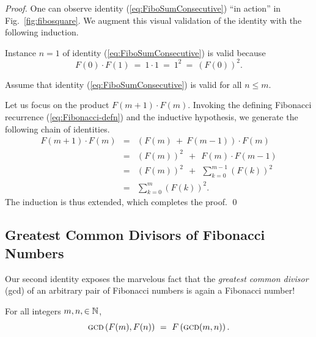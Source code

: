 \begin{proof}
One can observe identity (\ref{eq:FiboSumConsecutive}) ``in action'' in Fig.~\ref{fig:fibosquare}.  We augment this visual validation of the identity with the following induction.

\medskip

Instance $n=1$ of identity (\ref{eq:FiboSumConsecutive}) is valid because
\[ F(0) \cdot F(1) \ = \ 1 \cdot 1 \ = \ 1^2 \ = \ (F(0))^2. \]

\medskip

Assume that identity (\ref{eq:FiboSumConsecutive}) is valid for all $n \leq m$.

\medskip

Let us focus on the product $F(m+1) \cdot F(m)$.  Invoking the defining Fibonacci recurrence
(\ref{eq:Fibonacci-defn}) and the inductive hypothesis, we generate the following chain of identities.
\begin{eqnarray*}
F(m+1) \cdot F(m)
 & = &
   (F(m) \ + \ F(m-1)) \cdot F(m) \\
 & = &
   (F(m))^2 \ \ + \ \ F(m) \cdot F(m-1)  \\
 & = & 
   (F(m))^2  \ \ + \ \ \sum_{k=0}^{m-1} (F(k))^2  \\
 & = &
   \sum_{k=0}^{m} (F(k))^2.
\end{eqnarray*}
The induction is thus extended, which completes the proof.  \qed
\end{proof}



\subsection{Greatest Common Divisors of Fibonacci Numbers}
\label{Appendix:FiboGCD}

Our second identity exposes the marvelous fact that the {\em greatest common divisor} ({\sc gcd}) of an arbitrary pair of Fibonacci numbers is again a Fibonacci number!

\begin{prop}
For all integers $m, n, \in \mathbb{N}$,
\begin{equation}
\label{eq:fibo-gcd}
\mbox{\sc gcd} \left(F(m), F(n) \right) \ = \ F \left(\mbox{\sc gcd}(m, n) \right).
\end{equation}
\end{prop}

\medskip

